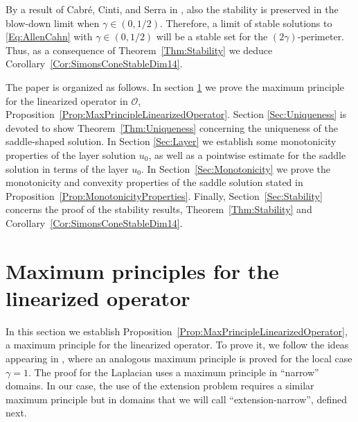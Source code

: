 \documentclass[12pt,reqno]{amsart}
\theoremstyle{definition}
\theoremstyle{remark}
\newcommand{\ocal}{\mathcal{O}}
\newcommand{\s}{\gamma}
\numberwithin{equation}{section}
\begin{document}
By a result of Cabré, Cinti, and Serra in \cite{CabreCintiSerra-Stable}, also the stability is preserved in the blow-down limit when $\s\in(0,1/2)$. Therefore, a limit of stable solutions to \eqref{Eq:AllenCahn} with $\s \in (0,1/2)$ will be a stable set for the $(2\s)$-perimeter. Thus, as a consequence of Theorem~\ref{Thm:Stability} we deduce Corollary~\ref{Cor:SimonsConeStableDim14}.

The paper is organized as follows. In section \ref{Sec:MaximumPrinciple} we prove the maximum principle for the linearized operator in $\ocal$, Proposition~\ref{Prop:MaxPrincipleLinearizedOperator}. Section \ref{Sec:Uniqueness} is devoted to show Theorem~\ref{Thm:Uniqueness} concerning the uniqueness of the saddle-shaped solution. In Section \ref{Sec:Layer} we establish some monotonicity properties of the layer solution $u_0$, as well as a pointwise estimate for the saddle solution in terms of the layer $u_0$. In Section~\ref{Sec:Monotonicity} we prove the monotonicity and convexity properties of the saddle solution stated in Proposition~\ref{Prop:MonotonicityProperties}. Finally, Section~\ref{Sec:Stability} concerns the proof of the stability results, Theorem~\ref{Thm:Stability} and  Corollary~\ref{Cor:SimonsConeStableDim14}.





\section{Maximum principles for the linearized operator}
\label{Sec:MaximumPrinciple}

In this section we establish Proposition~\ref{Prop:MaxPrincipleLinearizedOperator}, a maximum principle for the linearized operator. To prove it, we follow the ideas appearing in \cite{Cabre-Saddle}, where an analogous maximum principle is proved for the local case $\s = 1$. The proof for the Laplacian uses a maximum principle in ``narrow'' domains. In our case, the use of the extension problem requires a similar maximum principle but in domains that we will call ``extension-narrow''\!, defined next.
\end{document}
